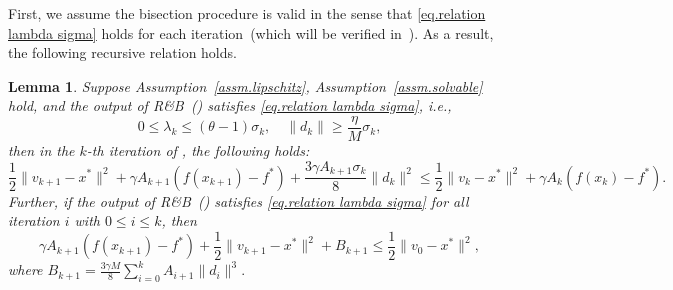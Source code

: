 \documentclass{article}
\newtheorem{lemma}[theorem]{Lemma}
\numberwithin{equation}{section}
\numberwithin{equation}{section}
\begin{document}
First, we assume the bisection procedure is valid in the sense that \eqref{eq.relation lambda sigma} holds for each iteration~(which will be verified in~).
As a result, the following recursive relation holds.
\begin{lemma}\label{lem.ms estimate}
    Suppose Assumption~\ref{assm.lipschitz}, Assumption~\ref{assm.solvable} hold, and the output of \textnormal{R\&B}~() satisfies \eqref{eq.relation lambda sigma}, i.e.,
    \begin{equation*}
        0\leq\lambda_k\leq (\theta-1)\sigma_k, \quad \|d_k\|\geq \frac{\eta}{M}\sigma_k,
    \end{equation*}
    then in the $k$-th iteration of , the following holds:
    \begin{equation}
        \label{eq.helper bounded x}
        \frac{1}{2}\|v_{k+1}-x^* \|^2 +\gamma A_{k+1}\left(f(x_{k+1})-f^*\right)+ \frac{3\gamma A_{k+1}\sigma_k}{8}\|d_k\|^2 \leq \frac{1}{2}\|v_k-x^*\|^2 +\gamma A_k \left (f(x_k)-f^*\right).
    \end{equation}
    Further, if the output of \textnormal{R\&B}~() satisfies \eqref{eq.relation lambda sigma} for all iteration $i$ with $0\leq i\leq k$, then
    \begin{equation}
        \label{eq.ms estimate advanced}
        \gamma A_{k+1}\left (f(x_{k+1})-f^* \right) + \frac{1}{2}\|v_{k+1}-x^*\|^2 +B_{k+1} \leq \frac{1}{2}\|v_0-x^*\|^2,
    \end{equation}
    where $B_{k+1} = \frac{3\gamma M}{8}\sum_{i=0}^{k}A_{i+1}\|d_i\|^3.$
\end{lemma}
\end{document}
